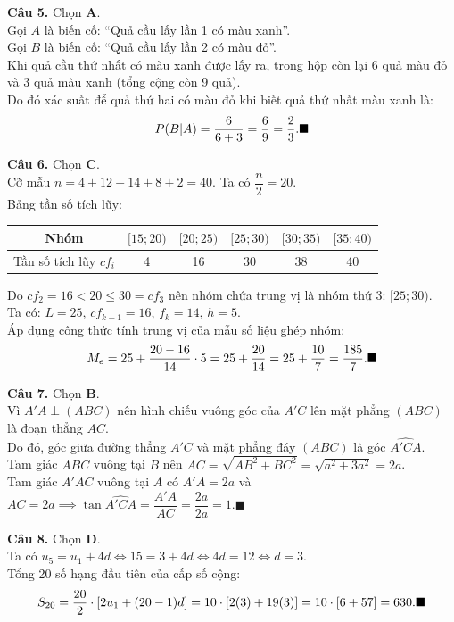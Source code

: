 \documentclass[12pt,a4paper]{article}
\begin{document}
\vspace{0.2cm}\noindent\textbf{Câu 5.} Chọn \textbf{A}.\\
Gọi $A$ là biến cố: ``Quả cầu lấy lần 1 có màu xanh''.\\
Gọi $B$ là biến cố: ``Quả cầu lấy lần 2 có màu đỏ''.\\
Khi quả cầu thứ nhất có màu xanh được lấy ra, trong hộp còn lại $6$ quả màu đỏ và $3$ quả màu xanh (tổng cộng còn 9 quả).\\
Do đó xác suất để quả thứ hai có màu đỏ khi biết quả thứ nhất màu xanh là:
$$P(B|A) = \dfrac{6}{6 + 3} = \dfrac{6}{9} = \dfrac{2}{3}.\hfill\blacksquare$$

\vspace{0.2cm}\noindent\textbf{Câu 6.} Chọn \textbf{C}.\\
Cỡ mẫu $n = 4 + 12 + 14 + 8 + 2 = 40$. Ta có $\dfrac{n}{2} = 20$.\\
Bảng tần số tích lũy:
\begin{center}
\begin{tabular}{|c|c|c|c|c|c|}
\hline
Nhóm & $[15; 20)$ & $[20; 25)$ & $[25; 30)$ & $[30; 35)$ & $[35; 40)$ \\ \hline
Tần số tích lũy $cf_i$ & 4 & 16 & 30 & 38 & 40 \\ \hline
\end{tabular}
\end{center}
Do $cf_2 = 16 < 20 \le 30 = cf_3$ nên nhóm chứa trung vị là nhóm thứ 3: $[25; 30)$.\\
Ta có: $L = 25$, $cf_{k-1} = 16$, $f_k = 14$, $h = 5$.\\
Áp dụng công thức tính trung vị của mẫu số liệu ghép nhóm:
$$M_e = 25 + \dfrac{20 - 16}{14} \cdot 5 = 25 + \dfrac{20}{14} = 25 + \dfrac{10}{7} = \dfrac{185}{7}.\hfill\blacksquare$$

\vspace{0.2cm}\noindent\textbf{Câu 7.} Chọn \textbf{B}.\\
Vì $A'A \perp (ABC)$ nên hình chiếu vuông góc của $A'C$ lên mặt phẳng $(ABC)$ là đoạn thẳng $AC$.\\
Do đó, góc giữa đường thẳng $A'C$ và mặt phẳng đáy $(ABC)$ là góc $\widehat{A'CA}$.\\
Tam giác $ABC$ vuông tại $B$ nên $AC = \sqrt{AB^2 + BC^2} = \sqrt{a^2 + 3a^2} = 2a$.\\
Tam giác $A'AC$ vuông tại $A$ có $A'A = 2a$ và $AC = 2a \implies \tan \widehat{A'CA} = \dfrac{A'A}{AC} = \dfrac{2a}{2a} = 1$.\hfill$\blacksquare$

\vspace{0.2cm}\noindent\textbf{Câu 8.} Chọn \textbf{D}.\\
Ta có $u_5 = u_1 + 4d \iff 15 = 3 + 4d \iff 4d = 12 \iff d = 3$.\\
Tổng 20 số hạng đầu tiên của cấp số cộng:
$$S_{20} = \dfrac{20}{2} \cdot \left[2u_1 + (20 - 1)d\right] = 10 \cdot [2(3) + 19(3)] = 10 \cdot [6 + 57] = 630.\hfill\blacksquare$$
\end{document}
